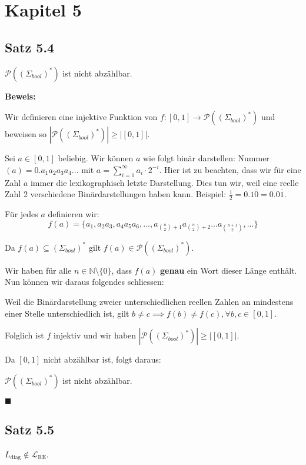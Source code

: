 \documentclass[a4paper, 11pt]{article}
\def\N{\mathbb{N}}
\def\L{\mathcal{L}}
\begin{document}
    \section*{Kapitel 5}

    \subsection*{Satz 5.4}
    $\mathcal{P}((\Sigma_{bool})^*)$ ist nicht abzählbar.

    \textbf{Beweis: }

    Wir definieren eine injektive Funktion von $f: [0, 1] \to \mathcal{P}((\Sigma_{bool})^*)$ und beweisen so $|\mathcal{P}((\Sigma_{bool})^*)| \geq |[0, 1]|$.

    Sei $a \in [0, 1]$ beliebig. Wir können $a$ wie folgt binär darstellen:
    Nummer$(a) = 0.a_1a_2a_3a_4...$ mit $a = \sum_{i = 1}^{\infty} a_i\cdot 2^{-i}$. Hier ist zu beachten, dass wir für eine Zahl $a$ immer die lexikographisch letzte Darstellung. Dies tun wir, weil eine reelle Zahl 2 verschiedene Binärdarstellungen haben kann. Beispiel: $\frac{1}{2} = 0.1\overline{0} = 0.0\overline{1}$.
    
    Für jedes $a$ definieren wir:
    $$f(a) = \{a_1, a_2a_3, a_4a_5a_6, ..., a_{\binom{n}{2}+1}a_{\binom{n}{2}+2}...a_{\binom{n+1}{2}} , ...\}$$

    Da $f(a) \subseteq (\Sigma_{bool})^*$ gilt $f(a) \in \mathcal{P}((\Sigma_{bool})^*)$.

    Wir haben für alle $n \in \N \setminus\{0\}$, dass $f(a)$ \textbf{genau} ein Wort dieser Länge enthält. Nun können wir daraus folgendes schliessen:

    Weil die Binärdarstellung zweier unterschiedlichen reellen Zahlen an mindestens einer Stelle unterschiedlich ist, gilt $b \neq c \implies f(b) \neq f(c), \forall b,c \in [0, 1]$. 

    Folglich ist $f$ injektiv und wir haben $|\mathcal{P}((\Sigma_{bool})^*)| \geq |[0, 1]|$.

    Da $[0,1]$ nicht abzählbar ist, folgt daraus:

    $\mathcal{P}((\Sigma_{bool})^*)$ ist nicht abzählbar.
    
    \hspace*{0pt}\hfill$\blacksquare$

    \subsection*{Satz 5.5}
    $L_{\text{diag}} \notin \L_{\text{RE}}$.
\end{document}
